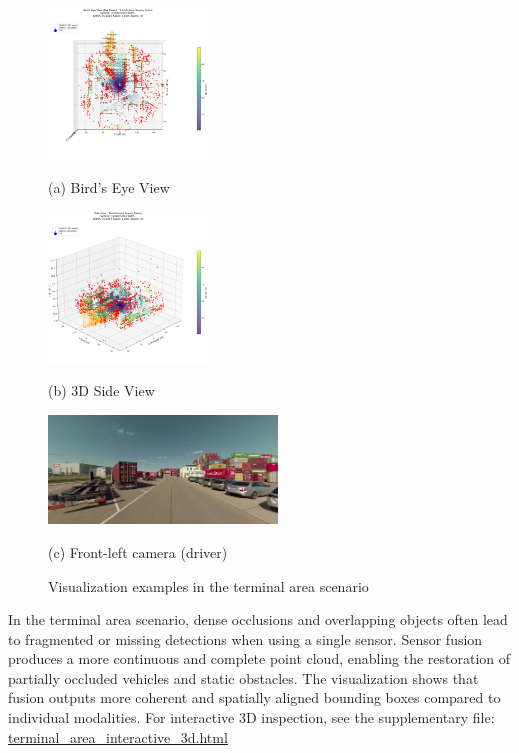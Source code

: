 \documentclass[10pt, a4paper, oneside]{article}
\begin{document}
\begin{figure}[H]
    \centering
    \begin{minipage}[t]{0.32\textwidth}
        \centering
        \includegraphics[height=4cm]{../output/scene_terminal_area/32d2bcf46e734dffb14fe2e0a823d059/visualizations/top_view.png}
        \caption*{(a) Bird’s Eye View}
    \end{minipage}
    \begin{minipage}[t]{0.32\textwidth}
        \centering
        \includegraphics[height=4cm]{../output/scene_terminal_area/32d2bcf46e734dffb14fe2e0a823d059/visualizations/side_view.png}
        \caption*{(b) 3D Side View}
    \end{minipage}
    \begin{minipage}[t]{0.32\textwidth}
        \centering
        \includegraphics[height=2.9cm]{../output/scene_terminal_area/32d2bcf46e734dffb14fe2e0a823d059/front_left_camera.jpg}
        \caption*{(c) Front-left camera (driver)}
    \end{minipage}
    \caption{Visualization examples in the terminal area scenario}
    \label{fig:terminal_area_viz}
\end{figure}

In the terminal area scenario, dense occlusions and overlapping objects often lead to fragmented or missing detections when using a single sensor. Sensor fusion produces a more continuous and complete point cloud, enabling the restoration of partially occluded vehicles and static obstacles. The visualization shows that fusion outputs more coherent and spatially aligned bounding boxes compared to individual modalities.
For interactive 3D inspection, see the supplementary file:  \href{run:../output/scene_terminal_area/32d2bcf46e734dffb14fe2e0a823d059/interactive_3d.html}{terminal\_area\_interactive\_3d.html}
\begin{small}
\end{small}
\end{document}
